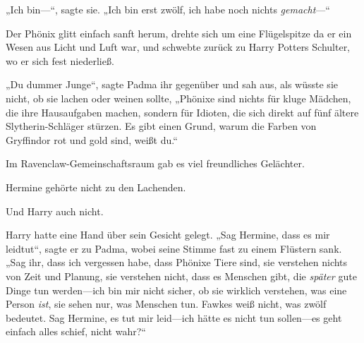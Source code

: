 „Ich bin—“, sagte sie. „Ich bin erst zwölf, ich habe noch nichts \emph{gemacht}—“

Der Phönix glitt einfach sanft herum, drehte sich um eine Flügelspitze da er ein Wesen aus Licht und Luft war, und schwebte zurück zu Harry Potters Schulter, wo er sich fest niederließ.

„Du dummer Junge“, sagte Padma ihr gegenüber und sah aus, als wüsste sie nicht, ob sie lachen oder weinen sollte, „Phönixe sind nichts für kluge Mädchen, die ihre Hausaufgaben machen, sondern für Idioten, die sich direkt auf fünf ältere Slytherin-Schläger stürzen. Es gibt einen Grund, warum die Farben von Gryffindor rot und gold sind, weißt du.“

Im Ravenclaw-Gemeinschaftsraum gab es viel freundliches Gelächter.

Hermine gehörte nicht zu den Lachenden.

Und Harry auch nicht.

Harry hatte eine Hand über sein Gesicht gelegt. „Sag Hermine, dass es mir leidtut“, sagte er zu Padma, wobei seine Stimme fast zu einem Flüstern sank. „Sag ihr, dass ich vergessen habe, dass Phönixe Tiere sind, sie verstehen nichts von Zeit und Planung, sie verstehen nicht, dass es Menschen gibt, die \emph{später} gute Dinge tun werden—ich bin mir nicht sicher, ob sie wirklich verstehen, was eine Person \emph{ist}, sie sehen nur, was Menschen tun. Fawkes weiß nicht, was zwölf bedeutet. Sag Hermine, es tut mir leid—ich hätte es nicht tun sollen—es geht einfach alles schief, nicht wahr?“

